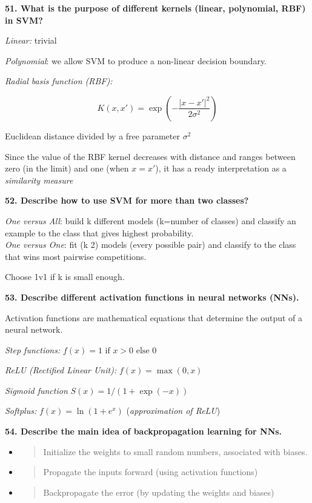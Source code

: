 \textbf{51. What is the purpose of different kernels (linear,
polynomial, RBF) in SVM?}

\textit{Linear:} trivial

\textit{Polynomial}: we allow SVM to produce a non-linear decision
boundary.

\textit{Radial basis function (RBF):}

\[ K(x, x') = \exp \left( - \frac{ | x - x' | ^2 }{ 2\sigma^2} \right) \]

Euclidean distance divided by a free parameter $\sigma^2$

Since the value of the RBF kernel decreases with distance and ranges
between zero (in the limit) and one (when $x = x'$), it has a ready
interpretation as a \emph{similarity measure}

\textbf{52. Describe how to use SVM for more than two classes?}

\textit{One versus All}: build k different models (k=number of
classes) and classify an example to the class that gives highest
probability.\\
\textit{One versus One}: fit (k 2) models (every possible pair) and
classify to the class that wins most pairwise competitions.

Choose 1v1 if k is small enough.

\textbf{53. Describe different activation functions in neural networks
(NNs).}

Activation functions are mathematical equations that determine the
output of a neural network.

\textit{Step functions:} $f(x) = {1 \text{ if } x > 0 \text{ else } 0}$

\textit{ReLU (Rectified Linear Unit):} $f(x) = \max(0, x)$

\textit{Sigmoid function} $ S(x) = 1/(1+\exp(-x)) $

\textit{Softplus:} $f(x) = \ln(1+e^x)$ (\textit{approximation of ReLU})

\textbf{54. Describe the main idea of backpropagation learning for NNs.}

\begin{itemize}
\item
  \begin{quote}
  Initialize the weights to small random numbers, associated with
  biases.
  \end{quote}
\item
  \begin{quote}
  Propagate the inputs forward (using activation functions)
  \end{quote}
\item
  \begin{quote}
  Backpropagate the error (by updating the weights and biases)
  \end{quote}
\end{itemize}

